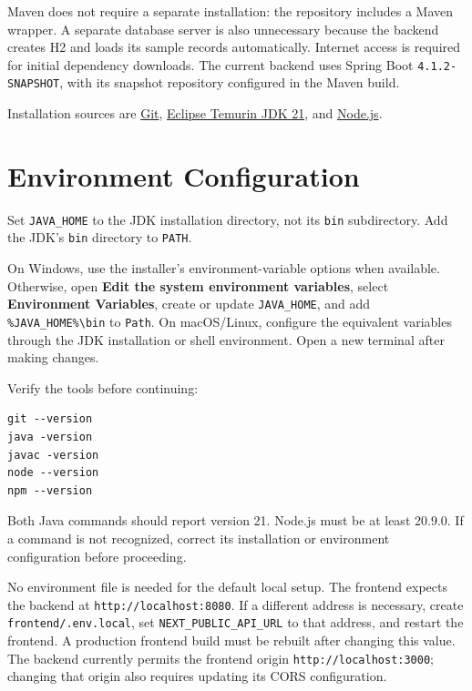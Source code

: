 \documentclass[11pt]{report}
\begin{document}
Maven does not require a separate installation: the repository includes a Maven wrapper. A separate database server is also unnecessary because the backend creates H2 and loads its sample records automatically. Internet access is required for initial dependency downloads. The current backend uses Spring Boot \texttt{4.1.2-SNAPSHOT}, with its snapshot repository configured in the Maven build.

Installation sources are \href{https://git-scm.com/install/}{Git}, \href{https://adoptium.net/temurin/releases/?version=21}{Eclipse Temurin JDK 21}, and \href{https://nodejs.org/en/download}{Node.js}.

\section{Environment Configuration}
Set \texttt{JAVA\_HOME} to the JDK installation directory, not its \texttt{bin} subdirectory. Add the JDK's \texttt{bin} directory to \texttt{PATH}.

On Windows, use the installer's environment-variable options when available. Otherwise, open \textbf{Edit the system environment variables}, select \textbf{Environment Variables}, create or update \texttt{JAVA\_HOME}, and add \texttt{\%JAVA\_HOME\%\textbackslash bin} to \texttt{Path}. On macOS/Linux, configure the equivalent variables through the JDK installation or shell environment. Open a new terminal after making changes.

Verify the tools before continuing:
\begin{samepage}
\begin{verbatim}
git --version
java -version
javac -version
node --version
npm --version
\end{verbatim}
\end{samepage}
Both Java commands should report version 21. Node.js must be at least 20.9.0. If a command is not recognized, correct its installation or environment configuration before proceeding.

No environment file is needed for the default local setup. The frontend expects the backend at \texttt{http://localhost:8080}. If a different address is necessary, create \texttt{frontend/.env.local}, set \texttt{NEXT\_PUBLIC\_API\_URL} to that address, and restart the frontend. A production frontend build must be rebuilt after changing this value. The backend currently permits the frontend origin \texttt{http://localhost:3000}; changing that origin also requires updating its CORS configuration.
\end{document}

